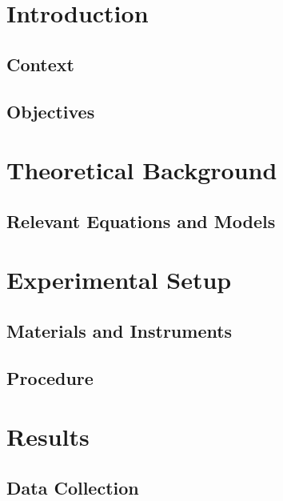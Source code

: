 \section{Introduction}

\subsection{Context}

\subsection{Objectives}

\section{Theoretical Background}

\subsection{Relevant Equations and Models}

\section{Experimental Setup}

\subsection{Materials and Instruments}

\subsection{Procedure}

\section{Results}

\subsection{Data Collection}

